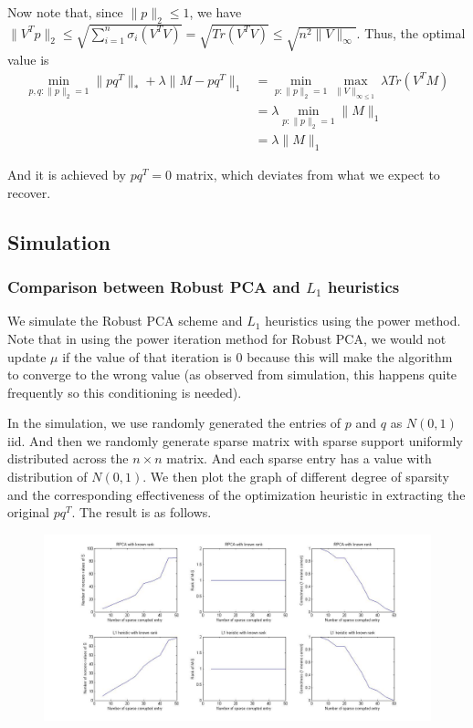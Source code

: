 Now note that, since $\|p\|_{2}\le1$, we have $\|V^{T}p\|_{2}\le\sqrt{\sum_{i=1}^{n}\sigma_{i}(V^{T}V)}=\sqrt{Tr(V^{T}V)}\le\sqrt{n^{2}\|V\|_{\infty}}$.
Thus, the optimal value is
\begin{align*}
\min_{p,q:\|p\|_{2}=1}\|pq^{T}\|_{*}+\lambda\|M-pq^{T}\|_{1}
& = \min_{p:\|p\|_{2}=1}\max_{\|V\|_{\infty\le1}}\lambda Tr(V^{T}M)\\
& = \lambda \min_{p:\|p\|_{2}=1}\|M\|_{1}\\
& = \lambda \|M\|_{1}
\end{align*}


And it is achieved by $pq^{T}=0$ matrix, which deviates from what
we expect to recover.


\subsection{Simulation }


\subsubsection{Comparison between Robust PCA and $L_{1}$ heuristics}

We simulate the Robust PCA scheme and $L_{1}$ heuristics using the power method. Note that in using the power iteration method for Robust PCA, we would not update $\mu$ if the value of that iteration is 0 because this will make the algorithm to converge to the wrong value (as observed from simulation, this happens quite frequently so this conditioning is needed).

In the simulation, we use randomly generated the entries of $p$ and $q$ as $N(0,1)$ iid. And then we randomly generate sparse matrix with sparse support uniformly distributed across the $n \times n$ matrix. And each sparse entry has a value with distribution of $N(0,1)$. We then plot the graph of different degree of sparsity and the corresponding effectiveness of the optimization heuristic in extracting the original $pq^{T}$. The result is as follows.

\begin{figure}[h!]
\label{fig:comparison}
\centering
\includegraphics[width=16cm]{../figures/compare.jpg}
\end{figure}

